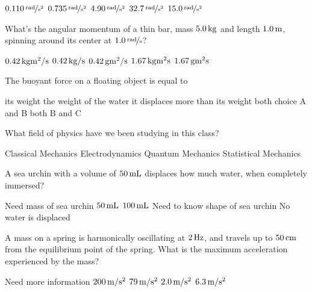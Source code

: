 \documentclass[answers]{exam}
\begin{document}
\begin{questions}

\begin{choices}
\CorrectChoice $\unitfrac[0.110]{rad}{s^2}$ 
\choice $\unitfrac[0.735]{rad}{s^2}$
\choice $\unitfrac[4.90]{rad}{s^2}$
\choice $\unitfrac[32.7]{rad}{s^2}$
\choice $\unitfrac[15.0]{rad}{s^2}$
\end{choices}

\question What's the angular momentum of a thin bar, mass $\unit[5.0]{kg}$ and length $\unit[1.0]{m}$, spinning around its center at $\unitfrac[1.0]{rad}{s}$?
\begin{choices}
\CorrectChoice $\unit[0.42]{kg m^2/s}$ 
\choice $\unit[0.42]{kg/s}$
\choice $\unit[0.42]{g m^2/s}$
\choice $\unit[1.67]{kg m^2 s}$
\choice $\unit[1.67]{g m^2 s}$
\end{choices}

\question The buoyant force on a floating object is equal to
\begin{choices}
\choice its weight
\choice the weight of the water it displaces
\choice more than its weight
\CorrectChoice both choice A and B 
\choice both B and C
\end{choices}

\question What field of physics have we been studying in this class?
\begin{choices}
\CorrectChoice Classical Mechanics 
\choice Electrodynamics
\choice Quantum Mechanics
\choice Statistical Mechanics
\end{choices}

\question A sea urchin with a volume of $\unit[50]{mL}$ displaces how much water, when completely immersed?
\begin{choices}
\choice Need mass of sea urchin
\CorrectChoice $\unit[50]{mL}$ 
\choice $\unit[100]{mL}$
\choice Need to know shape of sea urchin
\choice No water is displaced
\end{choices}

\question A mass on a spring is harmonically oscillating at $\unit[2]{Hz}$, and travels up to $\unit[50]{cm}$ from the equilibrium point of the spring. What is the maximum acceleration experienced by the mass?
\begin{choices}
\choice Need more information
\choice $\unit[200]{m/s^2}$
\CorrectChoice $\unit[79]{m/s^2}$ 
\choice $\unit[2.0]{m/s^2}$
\choice $\unit[6.3]{m/s^2}$
\end{choices}


\end{questions}
\end{document}
